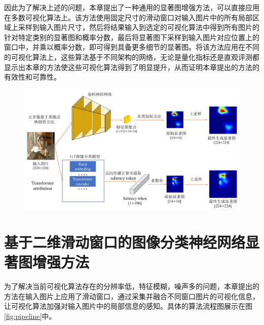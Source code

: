 因此为了解决上述的问题，本章提出了一种通用的显著图增强方法，可以直接应用在多数可视化算法上。该方法使用固定尺寸的滑动窗口对输入图片中的所有局部区域上采样到输入图片尺寸，然后将结果输入到选定的可视化算法中得到所有图片的针对特定类别的显著图和概率分数，最后将显著图下采样到输入图片对应位置上的窗口中，并乘以概率分数，即可得到具备更多细节的显著图。将该方法应用在不同的可视化算法上，这些算法基于不同架构的网络，无论是量化指标还是直观评测都显示出本章的方法使这些可视化算法得到了明显提升，从而证明本章提出的方法的有效性和可靠性。 

\begin{figure}[!ht]
	\centering 
	\includegraphics[width=15cm]{fig/ch4/motivation.pdf}
	\label{fig:motivation}
\end{figure}


\section{基于二维滑动窗口的图像分类神经网络显著图增强方法}\label{4:3}
为了解决当前可视化算法存在的分辨率低，特征模糊，噪声多的问题，本章提出的方法在输入图片上应用了滑动窗口，通过采集并融合不同窗口图片的可视化信息，让可视化算法加强对输入图片中的局部信息的感知。具体的算法流程图展示在图\ref{fig:pipeline}中。

